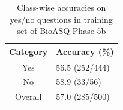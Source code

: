 \begin{table}[t!]
    \centering
    \begin{tabular}{c|l} \hline
    
    Category & Accuracy (\%) \\ \hline
    Yes      &  56.5  (252/444)\\
    No       &  58.9 (33/56) \\
    Overall  &  57.0 (285/500) \\      \hline
    \end{tabular}
    \caption{Class-wise accuracies on yes/no questions in training set of BioASQ Phase 5b}
    \label{tab:yesno_results}
\end{table}

